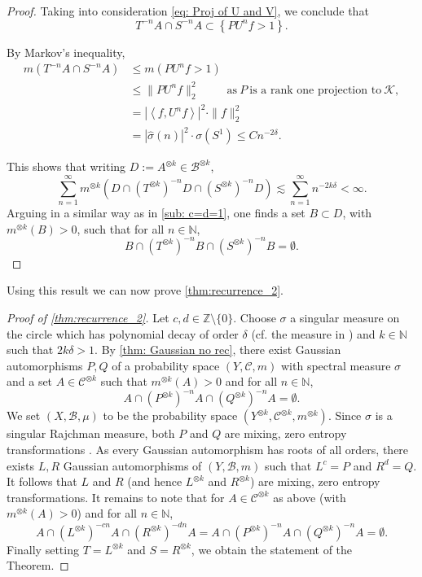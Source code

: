 \documentclass[12pt,reqno]{amsart}
\newcommand{\N}{\mathbb{N}}
\newcommand{\Z}{\mathbb{Z}}
\newcommand{\B}{\mathcal{B}}
\newtheorem{prop}[thm]{Proposition}
\theoremstyle{definition}
\begin{document}
\begin{proof}
Taking into consideration \eqref{eq: Proj of U and V}, we conclude that 
\[
T^{-n}A\cap S^{-n}A\subset \left\{PU^nf>1\right\}.
\]

By Markov's inequality,
\begin{align*}
m\left(T^{-n}A\cap S^{-n}A\right)&\leq m\left(PU^nf>1\right)\\&\leq \|PU^n f\|_2^2\ \ \ \ \ \ \ \ \ \ \ \text{as}\ P\ \text{is a rank one projection to}\ \mathcal{K},\\
&=\left|\left<f,U^nf\right>\right|^2\cdot \|f\|_2^2\\
&=\left|\hat{\sigma}(n)\right|^2\cdot \sigma\left(S^1\right)\leq Cn^{-2\delta}. 
\end{align*}

This shows that writing $D:=A^{\otimes k}\in\B^{\otimes k}$,
\[
\sum_{n=1}^\infty m^{\otimes k}\left(D\cap \left(T^{\otimes k}\right)^{-n}D\cap \left(S^{\otimes k}\right)^{-n}D\right)\lesssim \sum_{n=1}^\infty n^{-2k\delta}<\infty.
\]
Arguing in a similar way as in \cref{sub: c=d=1}, one finds a set $B\subset D$, with $m^{\otimes k}(B)>0$, such that for all $n\in \N$,
\[
B\cap \left(T^{\otimes k}\right)^{-n}B\cap \left(S^{\otimes k}\right)^{-n}B=\emptyset.
\]
\end{proof}
Using this result we can now prove \cref{thm:recurrence_2}. 

\begin{proof}[Proof of \cref{thm:recurrence_2}]
Let $c,d\in\Z\setminus \{0\}$. Choose $\sigma$ a singular measure on the circle which has polynomial decay of order $\delta$ (cf. the measure in \cite{Kaufman_1980}) and $k\in\N$ such that $2k\delta>1$. By \cref{thm: Gaussian no rec}, there exist Gaussian automorphisms $P,Q$ of a probability space $\left(Y,\mathcal{C},m\right)$ with spectral measure $\sigma$ and a set $A\in\mathcal{C}^{\otimes k}$ such that $m^{\otimes k}(A)>0$ and for all $n\in\N$,
\[
A\cap \left(P^{\otimes k}\right)^{-n}A\cap \left(Q^{\otimes k}\right)^{-n}A = \emptyset. 
\] We set $(X,\B,\mu)$ to be the probability space $(Y^{\otimes k},\mathcal{C}^{\otimes k},m^{\otimes k})$. Since $\sigma$ is a singular Rajchman measure, both $P$ and $Q$ are mixing, zero entropy transformations \cite{MR191718,MR1231420}.  As every Gaussian automorphism has roots of all orders, there exists $L,R$ Gaussian automorphisms of $(Y,\B,m)$ such that $L^c=P$ and $R^d=Q$. It follows that $L$ and $R$ (and hence $L^{\otimes k}$ and $R^{\otimes k}$) are mixing, zero entropy transformations. It remains to note that for $A\in\mathcal{C}^{\otimes k}$ as above (with $m^{\otimes k}(A)>0$) and for all $n\in\N$,
\[
A\cap \left(L^{\otimes k}\right)^{-cn}A\cap \left(R^{\otimes k}\right)^{-dn}A=A\cap \left(P^{\otimes k}\right)^{-n}A\cap \left(Q^{\otimes k}\right)^{-n}A = \emptyset. 
\] Finally setting $T = L^{\otimes k}$ and $S = R^{\otimes k}$, we obtain the statement of the Theorem. 
\end{proof}
\end{document}
